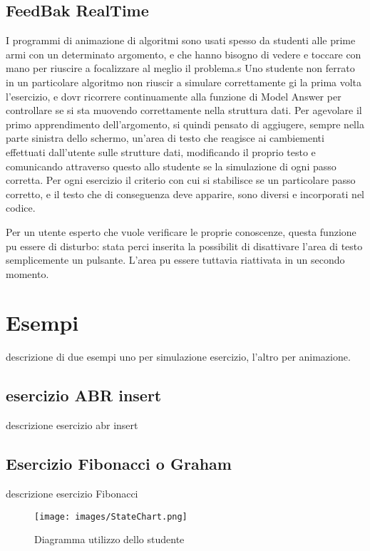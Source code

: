 \subsection{FeedBak RealTime}

I programmi di animazione di algoritmi sono usati spesso da studenti
alle prime armi con un determinato argomento, e che hanno bisogno
di vedere e toccare con mano per riuscire a focalizzare al meglio
il problema.s Uno studente non ferrato in un particolare algoritmo
non riuscir a simulare correttamente gi la prima volta l'esercizio,
e dovr ricorrere continuamente alla funzione di Model Answer per
controllare se si sta muovendo correttamente nella struttura dati.
Per agevolare il primo apprendimento dell'argomento, si  quindi pensato
di aggiugere, sempre nella parte sinistra dello schermo, un'area di
testo che reagisce ai cambiementi effettuati dall'utente sulle strutture
dati, modificando il proprio testo e comunicando attraverso questo
allo studente se la simulazione di ogni passo  corretta. Per ogni
esercizio il criterio con cui si stabilisce se un particolare passo
 corretto, e il testo che di conseguenza deve apparire, sono diversi
e incorporati nel codice.

Per un utente esperto che vuole verificare le proprie conoscenze,
questa funzione pu essere di disturbo:  stata perci inserita la
possibilit di disattivare l'area di testo semplicemente un pulsante.
L'area pu essere tuttavia riattivata in un secondo momento.


\section{\label{sec:Esempi}Esempi}

descrizione di due esempi uno per simulazione esercizio, l'altro per
animazione. 


\subsection{esercizio ABR insert}

descrizione esercizio abr insert


\subsection{Esercizio Fibonacci o Graham}

descrizione esercizio Fibonacci

\begin{figure}[htbp]
\centering
\texttt{[image: images/StateChart.png]}
\caption{Diagramma utilizzo dello studente}
\end{figure} 


